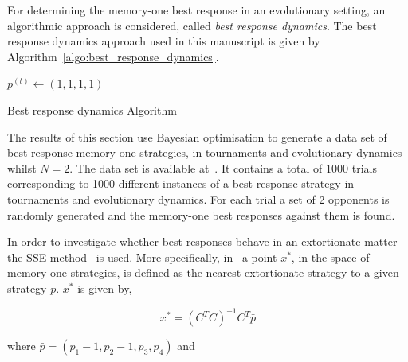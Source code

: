 \documentclass[10pt]{article}
\begin{document}
For determining the memory-one best response in an evolutionary setting, an
algorithmic approach is considered, called \textit{best response dynamics}. The
best response dynamics approach used in this manuscript is given by
Algorithm~\ref{algo:best_response_dynamics}.

\begin{center}
\begin{minipage}{.55\textwidth}
\begin{algorithm}[H]
       $p^{(t)}\leftarrow (1, 1, 1, 1)$\;
       \caption{Best response dynamics Algorithm}
       \label{algo:best_response_dynamics}
\end{algorithm}
\end{minipage}
\end{center}

The results of this section use Bayesian optimisation to generate a data set of best response
memory-one strategies, in tournaments and evolutionary dynamics whilst \(N=2\).
The data set is available at~\cite{glynatsi2019}. It contains a total of 1000 trials
corresponding to 1000 different instances of a best response strategy in
tournaments and evolutionary dynamics. For each trial a set of 2 opponents is
randomly generated and the memory-one best responses against them is found.


In order to investigate whether best responses
behave in an extortionate matter the SSE method~\cite{Knight2019} is used. More
specifically,
in~\cite{Knight2019} a point \(x^*\), in the space of memory-one strategies, is
defined as the nearest extortionate strategy to a given strategy \(p\). \(x^*\) is
given by,

\begin{equation}\label{eqn:x_star_formula}
    x^* = {\left(C^{T}C\right)}^{-1}C^{T}\bar{p}
\end{equation}

where \(\bar{p}=(p_1 - 1, p_2 - 1, p_3, p_4)\) and
\end{document}
